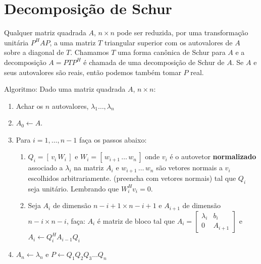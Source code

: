 \documentclass[10pt,a4paper]{article}
\begin{document}
\section{Decomposição de Schur}
\begin{theorem}
	Qualquer matriz quadrada $A$, $n \times n$ pode ser reduzida, por uma transformação unitária $P^HAP$, a uma matriz $T$ triangular superior com os autovalores de $A$ sobre a diagonal de $T$. Chamamos $T$ uma forma canônica de Schur para $A$ e a decomposição $A = PTP^H$ é chamada de uma decomposição de Schur de $A$. Se $A$ e seus autovalores são reais, então podemos também tomar $P$ real.
\end{theorem}
Algoritmo:
Dado uma matriz quadrada $A$, $n \times n$:
\begin{enumerate}
	\item Achar os $n$ autovalores, $\lambda_1 \dots, \lambda_n$
	\item $A_0 \leftarrow A$.
	\item Para $i = 1, \dots, n - 1$ faça os passos abaixo:
	\begin{enumerate}[label*=\arabic*.]
		\item $Q_i = [ \, v_i \, W_i \, ]$ e $W_i = [ \, w_{i+1} \, \dots \, w_{n} \, ]$ onde $v_i$ é o autovetor \textbf{normalizado} associado a $\lambda_i$ na matriz $A_i$ e $w_{i+1} \, \dots \, w_{n}$ são vetores normais a $v_i$ escolhidos arbitrariamente. (preencha com vetores normais) tal que $Q_i$ seja unitário. Lembrando que $W_i^Hv_i = 0$.
		\item Seja $A_i$ de dimensão $n - i + 1 \times n - i + 1$ e $A_{i+1}$ de dimensão $n - i \times n - i$, faça:
		$A_i$ é matriz de bloco tal que $A_i = \left[\begin{array}{cc}
			\lambda_i &     b_i \\
			        0 & A_{i+1}
		\end{array}\right]$ e  $A_i \leftarrow Q_i^H A_{i-1} Q_i$
	\end{enumerate}
	\item $A_n \leftarrow \lambda_n$ e $P \leftarrow Q_1 Q_2 Q_3 \dots Q_n$
\end{enumerate}
\end{document}
